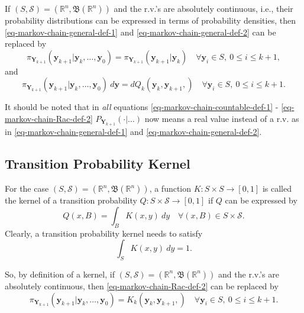 If $(S,\mathcal{S})=(\mathbb{R}^n,\mathfrak{B}(\mathbb{R}^n))$ and
the r.v.'s are absolutely continuous, i.e., their probability distributions can be expressed in terms of probability densities,
then \eqref{eq-markov-chain-general-def-1} and \eqref{eq-markov-chain-general-def-2} can be replaced by
\begin{equation}\label{eq-markov-chain-Rac-def-1}
\pi_{\mathbf{Y}_{k+1}}(
\mathbf{y}_{k+1}
|
\mathbf{y}_k,
\ldots,
\mathbf{y}_0
)
=
\pi_{\mathbf{Y}_{k+1}}(
\mathbf{y}_{k+1}
|
\mathbf{y}_k
)
\quad\forall
\mathbf{y}_i\in S,~0\leqslant i\leqslant k+1,
\end{equation}
and
\begin{equation}\label{eq-markov-chain-Rac-def-2}
\pi_{\mathbf{Y}_{k+1}}(
\mathbf{y}_{k+1}
|
\mathbf{y}_k,
\ldots,
\mathbf{y}_0
)~d\mathbf{y}
=
dQ_k(
\mathbf{y}_k,
\mathbf{y}_{k+1},
)
\quad\forall
\mathbf{y}_i\in S,~0\leqslant i\leqslant k+1.
\end{equation}

It should be noted that in {\it all} equations
\eqref{eq-markov-chain-countable-def-1}
-
\eqref{eq-markov-chain-Rac-def-2}
$P_{\mathbf{Y}_{k+1}}(\cdot|\ldots)$ now means a real value
instead of a r.v. as in \eqref{eq-markov-chain-general-def-1} and \eqref{eq-markov-chain-general-def-2}.

\subsection{Transition Probability Kernel}

For the case $(S,\mathcal{S})=(\mathbb{R}^n,\mathfrak{B}(\mathbb{R}^n))$,
a function $K:S\times S\rightarrow [0,1]$ is called the kernel of
a transition probability $Q:S\times\mathcal{S}\rightarrow [0,1]$
if $Q$ can be expressed by
\begin{equation*}
Q(x,B) = \int_B {K}(x,y)~dy \quad\forall (x,B)\in S\times\mathcal{S}.
\end{equation*}
Clearly, a transition probability kernel needs to satisfy
\begin{equation}\label{eq-kernel-necessary-cond}
\int_S {K}(x,y)~dy=1.
\end{equation}

So, by definition of a kernel, 
if $(S,\mathcal{S})=(\mathbb{R}^n,\mathfrak{B}(\mathbb{R}^n))$ and
the r.v.'s are absolutely continuous,
then
\eqref{eq-markov-chain-Rac-def-2} can be replaced by
\begin{equation}\label{eq-markov-chain-Rac-def-3}
\pi_{\mathbf{Y}_{k+1}}(
\mathbf{y}_{k+1}
|
\mathbf{y}_k,
\ldots,
\mathbf{y}_0
)
=
K_k(
\mathbf{y}_k,
\mathbf{y}_{k+1},
)
\quad\forall
\mathbf{y}_i\in S,~0\leqslant i\leqslant k+1.
\end{equation}


